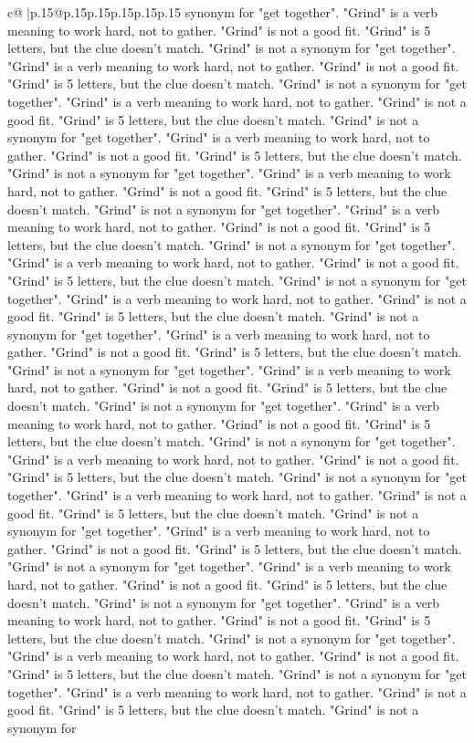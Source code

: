 \documentclass{article}
\begin{document}
{\begin{supertabular}{c@{$\;$}|p{.15\linewidth}@{}p{.15\linewidth}p{.15\linewidth}p{.15\linewidth}p{.15\linewidth}p{.15\linewidth}}
{{{synonym for "get together". "Grind" is a verb meaning to work hard, not to gather. "Grind" is not a good fit. "Grind" is 5 letters, but the clue doesn't match. "Grind" is not a synonym for "get together". "Grind" is a verb meaning to work hard, not to gather. "Grind" is not a good fit. "Grind" is 5 letters, but the clue doesn't match. "Grind" is not a synonym for "get together". "Grind" is a verb meaning to work hard, not to gather. "Grind" is not a good fit. "Grind" is 5 letters, but the clue doesn't match. "Grind" is not a synonym for "get together". "Grind" is a verb meaning to work hard, not to gather. "Grind" is not a good fit. "Grind" is 5 letters, but the clue doesn't match. "Grind" is not a synonym for "get together". "Grind" is a verb meaning to work hard, not to gather. "Grind" is not a good fit. "Grind" is 5 letters, but the clue doesn't match. "Grind" is not a synonym for "get together". "Grind" is a verb meaning to work hard, not to gather. "Grind" is not a good fit. "Grind" is 5 letters, but the clue doesn't match. "Grind" is not a synonym for "get together". "Grind" is a verb meaning to work hard, not to gather. "Grind" is not a good fit. "Grind" is 5 letters, but the clue doesn't match. "Grind" is not a synonym for "get together". "Grind" is a verb meaning to work hard, not to gather. "Grind" is not a good fit. "Grind" is 5 letters, but the clue doesn't match. "Grind" is not a synonym for "get together". "Grind" is a verb meaning to work hard, not to gather. "Grind" is not a good fit. "Grind" is 5 letters, but the clue doesn't match. "Grind" is not a synonym for "get together". "Grind" is a verb meaning to work hard, not to gather. "Grind" is not a good fit. "Grind" is 5 letters, but the clue doesn't match. "Grind" is not a synonym for "get together". "Grind" is a verb meaning to work hard, not to gather. "Grind" is not a good fit. "Grind" is 5 letters, but the clue doesn't match. "Grind" is not a synonym for "get together". "Grind" is a verb meaning to work hard, not to gather. "Grind" is not a good fit. "Grind" is 5 letters, but the clue doesn't match. "Grind" is not a synonym for "get together". "Grind" is a verb meaning to work hard, not to gather. "Grind" is not a good fit. "Grind" is 5 letters, but the clue doesn't match. "Grind" is not a synonym for "get together". "Grind" is a verb meaning to work hard, not to gather. "Grind" is not a good fit. "Grind" is 5 letters, but the clue doesn't match. "Grind" is not a synonym for "get together". "Grind" is a verb meaning to work hard, not to gather. "Grind" is not a good fit. "Grind" is 5 letters, but the clue doesn't match. "Grind" is not a synonym for "get together". "Grind" is a verb meaning to work hard, not to gather. "Grind" is not a good fit. "Grind" is 5 letters, but the clue doesn't match. "Grind" is not a synonym for "get together". "Grind" is a verb meaning to work hard, not to gather. "Grind" is not a good fit. "Grind" is 5 letters, but the clue doesn't match. "Grind" is not a synonym for "get together". "Grind" is a verb meaning to work hard, not to gather. "Grind" is not a good fit. "Grind" is 5 letters, but the clue doesn't match. "Grind" is not a synonym for }}}
\end{supertabular}}
\end{document}
